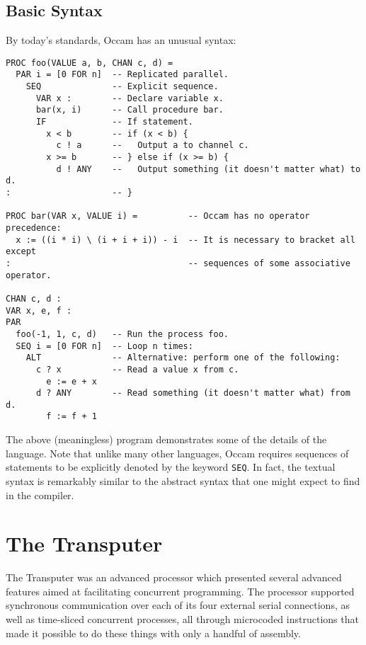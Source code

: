 \subsection{Basic Syntax}

By today's standards, Occam has an unusual syntax:

\begin{lstlisting}[language=occam]
PROC foo(VALUE a, b, CHAN c, d) =
  PAR i = [0 FOR n]  -- Replicated parallel.
    SEQ              -- Explicit sequence.
      VAR x :        -- Declare variable x.
      bar(x, i)      -- Call procedure bar.
      IF             -- If statement.
        x < b        -- if (x < b) {
          c ! a      --   Output a to channel c.
        x >= b       -- } else if (x >= b) {
          d ! ANY    --   Output something (it doesn't matter what) to d.
:                    -- }

PROC bar(VAR x, VALUE i) =          -- Occam has no operator precedence:
  x := ((i * i) \ (i + i + i)) - i  -- It is necessary to bracket all except
:                                   -- sequences of some associative operator.

CHAN c, d :
VAR x, e, f :
PAR
  foo(-1, 1, c, d)   -- Run the process foo.
  SEQ i = [0 FOR n]  -- Loop n times:
    ALT              -- Alternative: perform one of the following:
      c ? x          -- Read a value x from c.
        e := e + x
      d ? ANY        -- Read something (it doesn't matter what) from d.
        f := f + 1
\end{lstlisting}

The above (meaningless) program demonstrates some of the details of the
language. Note that unlike many other languages, Occam requires sequences of
statements to be explicitly denoted by the keyword \texttt{SEQ}. In fact, the
textual syntax is remarkably similar to the abstract syntax that one might
expect to find in the compiler.

\section{The Transputer}

The Transputer was an advanced processor which presented several advanced
features aimed at facilitating concurrent programming. The processor supported
synchronous communication over each of its four external serial connections, as
well as time-sliced concurrent processes, all through microcoded instructions
that made it possible to do these things with only a handful of assembly.

